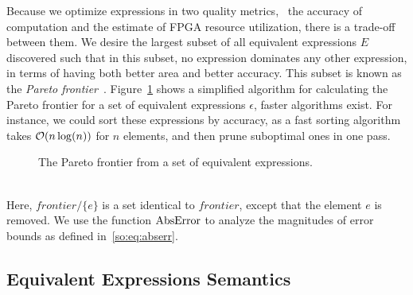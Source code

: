 Because we optimize expressions in two quality metrics, \ie~the accuracy
of computation and the estimate of FPGA resource utilization, there is a
trade-off between them. We desire the largest subset of all equivalent
expressions $E$ discovered such that in this subset, no expression dominates
any other expression, in terms of having both better area and better
accuracy. This subset is known as the \emph{Pareto frontier}~\cite{legriel10}.
Figure~\ref{so:alg:pareto} shows a simplified algorithm for calculating
the Pareto frontier for a set of equivalent expressions $\epsilon$, faster
algorithms exist.  For instance, we could sort these expressions by accuracy,
as a fast sorting algorithm takes $\operatorname{\mathcal{O}}(n\log(n))$ for $n$ elements, and then
prune suboptimal ones in one pass.
\begin{figure}[ht]
    \centering
    \begin{algorithmic}
                    \EndIf{}
                \EndFor{}
            \EndFor{}
        \EndFunction%
    \end{algorithmic}
    \caption{The Pareto frontier from a set of equivalent expressions.
    }\label{so:alg:pareto}
\end{figure} \\
Here, $\mathit{frontier} / \{ e \}$ is a set identical to $\mathit{frontier}$,
except that the element $e$ is removed.  We use the function $\operatorname{\mathrm{AbsError}}$ to
analyze the magnitudes of error bounds as defined in~\eqref{so:eq:abserr}.


\subsection{Equivalent Expressions Semantics}

